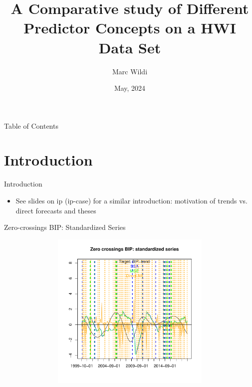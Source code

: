 \documentclass{beamer}
\title{A Comparative study of Different Predictor Concepts on a HWI Data Set}
\author{Marc Wildi}
\institute{Institute of data analysis and process design (ZHAW)}
\date{May, 2024}
\date[\today]{}
\begin{document}
\begin{frame}
\titlepage
\end{frame}




\begin{frame}[allowframebreaks]{Table of Contents}
\tableofcontents
\end{frame}


\section{Introduction}



\begin{frame} {Introduction}
\begin{itemize}
\item See slides on ip (ip-case) for a similar introduction: motivation of trends vs. direct forecasts and theses
\end{itemize}
\end{frame}


\begin{frame} {Zero-crossings BIP: Standardized Series}
\begin{figure}[H]\begin{center}\includegraphics[height=3in, width=4.5in]{zero_cross_ifo_l_1.pdf}\caption{\label{data}}\end{center}\end{figure}\end{frame}
\end{document}
